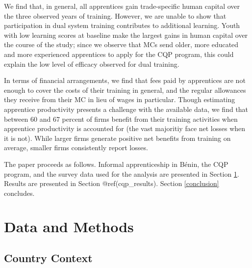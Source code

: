 \documentclass[
  11pt,
a4paper
]{report}
\begin{document}
We find that, in general, all apprentices gain trade-specific human capital over the three observed years of training. However, we are unable to show that participation in dual system training contributes to additional learning. Youth with low learning scores at baseline make the largest gains in human capital over the course of the study; since we observe that MCs send older, more educated and more experienced apprentices to apply for the CQP program, this could explain the low level of efficacy observed for dual training.

In terms of financial arrangements, we find that fees paid by apprentices are not enough to cover the costs of their training in general, and the regular allowances they receive from their MC in lieu of wages in particular. Though estimating apprentice productivity presents a challenge with the available data, we find that between 60 and 67 percent of firms benefit from their training activities when apprentice productivity is accounted for (the vast majoritiy face net losses when it is not). While larger firms generate positive net benefits from training on average, smaller firms consistently report losses.

The paper proceeds as follows. Informal apprenticeship in Bénin, the CQP program, and the survey data used for the analysis are presented in Section \ref{data}. Results are presented in Section @ref(cqp\_results). Section \ref{conclusion} concludes.

\FloatBarrier

\hypertarget{data}{%
\section{Data and Methods}\label{data}}

\hypertarget{country-context}{%
\subsection{Country Context}\label{country-context}}
\end{document}
